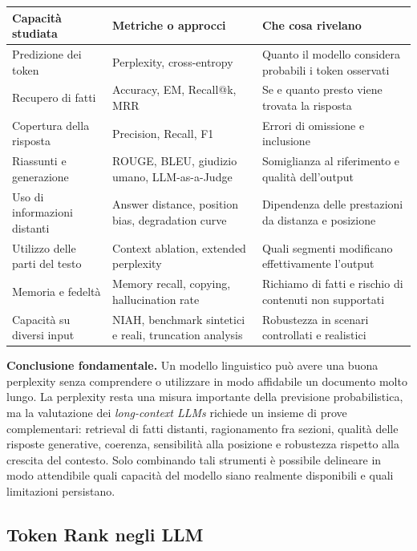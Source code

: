 \begin{center}
\begin{tabular}{p{}|p{}|p{}}
\textbf{Capacità studiata} & \textbf{Metriche o approcci} & \textbf{Che cosa rivelano} \\
\hline
Predizione dei token & Perplexity, cross-entropy & Quanto il modello considera probabili i token osservati \\
Recupero di fatti & Accuracy, EM, Recall@k, MRR & Se e quanto presto viene trovata la risposta \\
Copertura della risposta & Precision, Recall, F1 & Errori di omissione e inclusione \\
Riassunti e generazione & ROUGE, BLEU, giudizio umano, LLM-as-a-Judge & Somiglianza al riferimento e qualità dell'output \\
Uso di informazioni distanti & Answer distance, position bias, degradation curve & Dipendenza delle prestazioni da distanza e posizione \\
Utilizzo delle parti del testo & Context ablation, extended perplexity & Quali segmenti modificano effettivamente l'output \\
Memoria e fedeltà & Memory recall, copying, hallucination rate & Richiamo di fatti e rischio di contenuti non supportati \\
Capacità su diversi input & NIAH, benchmark sintetici e reali, truncation analysis & Robustezza in scenari controllati e realistici
\end{tabular}
\end{center}

\noindent\textbf{Conclusione fondamentale.} Un modello linguistico può avere una buona perplexity senza comprendere o utilizzare in modo affidabile un documento molto lungo. La perplexity resta una misura importante della previsione probabilistica, ma la valutazione dei \emph{long-context LLMs} richiede un insieme di prove complementari: retrieval di fatti distanti, ragionamento fra sezioni, qualità delle risposte generative, coerenza, sensibilità alla posizione e robustezza rispetto alla crescita del contesto. Solo combinando tali strumenti è possibile delineare in modo attendibile quali capacità del modello siano realmente disponibili e quali limitazioni persistano.



\subsection{Token Rank negli LLM}

